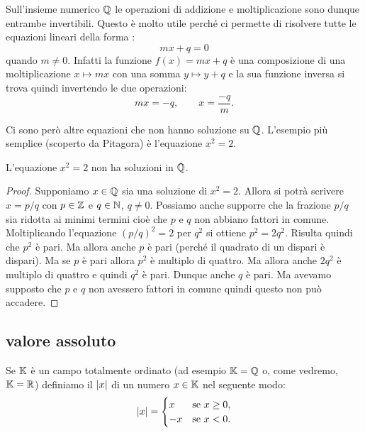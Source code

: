 Sull'insieme numerico ${\mathbb Q}$ le operazioni di addizione e moltiplicazione 
sono dunque entrambe invertibili. 
Questo è molto utile perché ci permette di risolvere tutte le equazioni lineari
della forma :
\[
  mx + q = 0  
\]
quando $m\neq 0$. Infatti la funzione $f(x) = mx+q$ è una composizione 
di una moltiplicazione $x\mapsto mx$ con una somma $y\mapsto y+q$ e la sua funzione
inversa si trova quindi invertendo le due operazioni: 
\[
  mx = -q, \qquad x = \frac{-q}{m}.  
\]

Ci sono però altre equazioni che non hanno soluzione su 
${\mathbb Q}$. 
L'esempio più semplice (scoperto da Pitagora) è l'equazione $x^2=2$.
%
\begin{theorem}
  \mymark{**}%
  \label{th:pitagora}%
  L'equazione $x^2=2$ non ha soluzioni in ${\mathbb Q}$.
  \end{theorem}
  \begin{proof}
  \mymark{*}%
  Supponiamo $x\in {\mathbb Q}$ sia una soluzione di $x^2=2$.
  Allora si potrà scrivere $x=p/q$ con $p\in {\mathbb Z}$ e $q\in {\mathbb N}$, $q\neq 0$.
  Possiamo anche supporre che la frazione $p/q$ sia ridotta ai minimi
  termini cioè che $p$ e $q$ non abbiano fattori in comune.
  Moltiplicando l'equazione
  $(p/q)^2=2$ per $q^2$ si ottiene $p^2 = 2 q^2$.
  Risulta quindi che $p^2$ è pari.
  Ma allora anche $p$ è pari (perché il quadrato di un dispari è dispari).
  Ma se $p$ è pari allora $p^2$ è multiplo di quattro.
  Ma allora anche $2q^2$ è multiplo di quattro e quindi $q^2$ è pari.
  Dunque anche $q$ è pari. Ma avevamo supposto che $p$ e $q$ non avessero
  fattori in comune quindi questo non può accadere.
\end{proof}

\subsection{valore assoluto}

\begin{definition}
\mymark{***}
Se ${\mathbb K}$ è un campo totalmente ordinato (ad esempio ${\mathbb K}={\mathbb Q}$ o, come vedremo, ${\mathbb K}={\mathbb R}$)
definiamo il  ${\left|x\right|}$ di un numero $x\in {\mathbb K}$ nel seguente modo:
\[
{\left|x\right|} =
\begin{cases}
  x & \text{se $x\ge 0$}, \\
  -x & \text{se $x<0 $}.
\end{cases}
\]
\end{definition}
  
